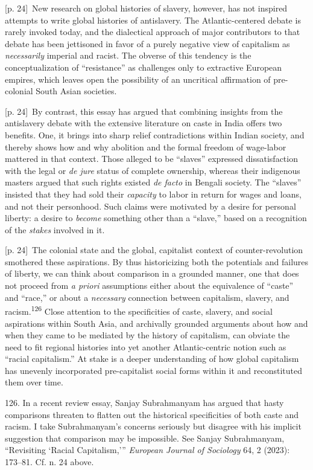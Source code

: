 \documentclass[10pt,a4paper]{article}
\begin{document}
{\scriptsize\color{gray} [p. 24]}\ New research on global histories of slavery, however, has not inspired attempts to write global histories of antislavery. The Atlantic-centered debate is rarely invoked today, and the dialectical approach of major contributors to that debate has been jettisoned in favor of a purely negative view of capitalism as \textit{necessarily} imperial and racist. The obverse of this tendency is the conceptualization of “resistance” as challenges only to extractive European empires, which leaves open the possibility of an uncritical affirmation of pre-colonial South Asian societies.\par
{\scriptsize\color{gray} [p. 24]}\ By contrast, this essay has argued that combining insights from the antislavery debate with the extensive literature on caste in India offers two benefits. One, it brings into sharp relief contradictions within Indian society, and thereby shows how and why abolition and the formal freedom of wage-labor mattered in that context. Those alleged to be “slaves” expressed dissatisfaction with the legal or \textit{de jure} status of complete ownership, whereas their indigenous masters argued that such rights existed \textit{de facto} in Bengali society. The “slaves” insisted that they had sold their \textit{capacity} to labor in return for wages and loans, and not their personhood. Such claims were motivated by a desire for personal liberty: a desire to \textit{become} something other than a “slave,” based on a recognition of the \textit{stakes} involved in it.\par
{\scriptsize\color{gray} [p. 24]}\ The colonial state and the global, capitalist context of counter-revolution smothered these aspirations. By thus historicizing both the potentials and failures of liberty, we can think about comparison in a grounded manner, one that does not proceed from \textit{a priori} assumptions either about the equivalence of “caste” and “race,” or about a \textit{necessary} connection between capitalism, slavery, and racism.\nobreak\textsuperscript{126} Close attention to the specificities of caste, slavery, and social aspirations within South Asia, and archivally grounded arguments about how and when they came to be mediated by the history of capitalism, can obviate the need to fit regional histories into yet another Atlantic-centric notion such as “racial capitalism.” At stake is a deeper understanding of how global capitalism has unevenly incorporated pre-capitalist social forms within it and reconstituted them over time.\par{\small 126. In a recent review essay, Sanjay Subrahmanyam has argued that hasty comparisons threaten to flatten out the historical specificities of both caste and racism. I take Subrahmanyam’s concerns seriously but disagree with his implicit suggestion that comparison may be impossible. See Sanjay Subrahmanyam, “Revisiting ‘Racial Capitalism,’” \textit{European Journal of Sociology} 64, 2 (2023): 173–81. Cf. n. 24 above.\par}
\end{document}
